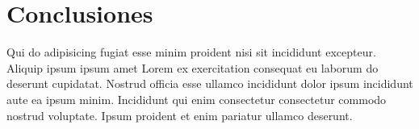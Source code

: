 \section{Conclusiones}\label{sec:conclusiones}
Qui do adipisicing fugiat esse minim proident nisi sit incididunt excepteur. Aliquip ipsum ipsum amet Lorem ex exercitation consequat eu laborum do deserunt cupidatat. Nostrud officia esse ullamco incididunt dolor ipsum incididunt aute ea ipsum minim. Incididunt qui enim consectetur consectetur commodo nostrud voluptate. Ipsum proident et enim pariatur ullamco deserunt.

